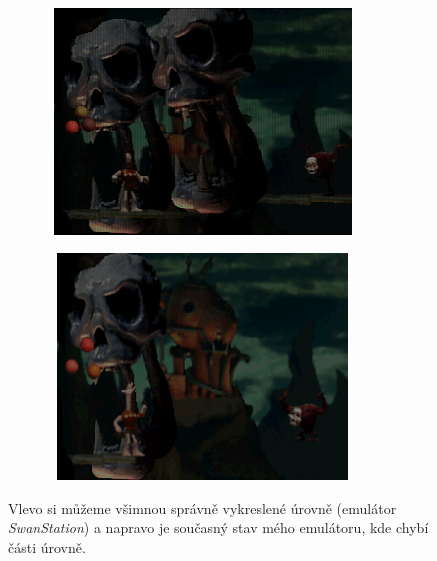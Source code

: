 \begin{figure}[hbt]
    \begin{subfigure}{0.5\textwidth}
        \centering
        \includegraphics[width=0.9\textwidth, height=6cm]{obrazky-figures/skullmonkeys-showcase-2-1.png}
    \end{subfigure}
    \begin{subfigure}{0.5\textwidth}
        \centering
        \includegraphics[width=0.9\textwidth, height=6cm]{obrazky-figures/skullmonkeys-showcase-2-2.png}
    \end{subfigure}
    \caption[Nedostatky ve hře \textit{Skullmonkeys}]{Vlevo si můžeme všimnou správně vykreslené úrovně (emulátor \textit{SwanStation}) a napravo je současný stav mého emulátoru, kde chybí části úrovně.}
    \label{skullmonkeys-showcase-2}
\end{figure}

